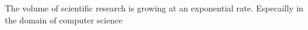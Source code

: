 The volume of scientific research is growing at an exponential rate. 
Especailly in the domain of computer science 